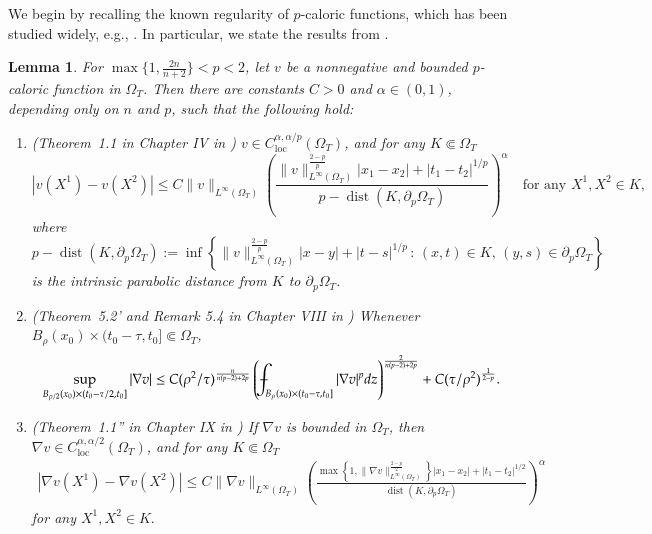 \documentclass[11pt,oneside,english]{amsart}
\newcommand{\al}{\alpha}
\newcommand{\dist}{\operatorname{dist}}
\newcommand{\loc}{\operatorname{loc}}
\newcommand{\D}{\nabla}
\numberwithin{equation}{section}
\def\Xint#1{\mathchoice
  {\XXint\displaystyle\textstyle{#1}}%
  {\XXint\textstyle\scriptstyle{#1}}%
  {\XXint\scriptstyle\scriptscriptstyle{#1}}%
  {\XXint\scriptscriptstyle\scriptscriptstyle{#1}}%
  \!\int}
\def\XXint#1#2#3{{\setbox0=\hbox{$#1{#2#3}{\int}$}
    \vcenter{\hbox{$#2#3$}}\kern-.5\wd0}}
\def\dashint{\Xint-}
\theoremstyle{plain}
\newtheorem{lemma}{Lemma}
\numberwithin{equation}{section}
\begin{document}
We begin by recalling the known regularity of $p$-caloric functions, which has been studied widely, e.g., \cite{CheDib88,DiB85,DiB93,DiBFri84,DiBFri85,Wie86}. In particular, we state the results from \cite{DiB93}.

\begin{lemma}
    \label{lem:p-caloric-reg}
    For $\max\{1,\frac{2n}{n+2}\}<p<2$, let $v$ be a nonnegative and bounded $p$-caloric function in $\Omega_T$. Then there are constants $C>0$ and $\al\in(0,1)$, depending only on $n$ and $p$, such that the following hold:
   
    \begin{enumerate}
    \item (Theorem~1.1 in Chapter {\rm IV}  in \cite{DiB93}) $v\in C^{\al,\al/p}_{\loc}(\Omega_T)$, and for any $K\Subset\Omega_T$
    $$
    |v(X^1)-v(X^2)|\le C\|v\|_{L^\infty(\Omega_T)}\left(\frac{\|v\|_{L^\infty(\Omega_T)}^{\frac{2-p}p}|x_1-x_2|+|t_1-t_2|^{1/p} }{p-\dist(K,\partial_p\Omega_T) }  \right)^{\al}\quad\text{for any }X^1,X^2\in K,
    $$
    where $p-\dist(K,\partial_p\Omega_T):=\inf\left\{\|v\|_{L^\infty(\Omega_T)}^{\frac{2-p}p}|x-y|+|t-s|^{1/p}\,:\, (x,t)\in K,\, (y,s)\in \partial_p\Omega_T \right\}$ is the intrinsic parabolic distance from $K$ to $\partial_p\Omega_T$.

\item (Theorem~5.2' and Remark 5.4 in Chapter {\rm VIII} in \cite{DiB93}) Whenever $B_\rho(x_0)\times(t_0-\tau,t_0]\Subset \Omega_T$,
    \begin{align*}
        \sup_{B_{\rho/2}(x_0)\times(t_0-\tau/2,t_0]}|\D v|\le C(\rho^2/\tau)^{\frac{n}{n(p-2)+2p}}\left(\dashint_{B_{\rho}(x_0)\times(t_0-\tau,t_0]}|\D v|^pdz\right)^{\frac{2}{n(p-2)+2p}}+C(\tau/\rho^2)^{\frac{1}{2-p}}.
    \end{align*}
    
    \item (Theorem~1.1'' in Chapter {\rm IX} in \cite{DiB93}) If $\D v$ is bounded in $\Omega_T$, then $\D v\in C^{\al,\al/2}_{\loc}(\Omega_T)$, and for any $K\Subset\Omega_T$
    \begin{align*}
    |\D v(X^1)-\D v(X^2)|\le C\|\D v\|_{L^\infty(\Omega_T)}\left(\frac{\max\left\{1,\|\D v\|_{L^\infty(\Omega_T)}^{\frac{2-p}2}\right\}|x_1-x_2|+|t_1-t_2|^{1/2} }{\dist(K,\partial_p\Omega_T)} \right)^\al
    \end{align*}    
   for any $X^1,X^2\in K.$
    \end{enumerate}
\end{lemma}
\end{document}
